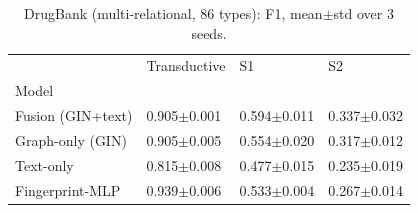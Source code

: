 \begin{table}[t]
\caption{DrugBank (multi-relational, 86 types): F1, mean$\pm$std over 3 seeds.}
\label{tab:drugbank-f1}
\begin{tabular}{llll}
\toprule
 & Transductive & S1 & S2 \\
Model &  &  &  \\
\midrule
Fusion (GIN+text) & 0.905$\pm$0.001 & 0.594$\pm$0.011 & 0.337$\pm$0.032 \\
Graph-only (GIN) & 0.905$\pm$0.005 & 0.554$\pm$0.020 & 0.317$\pm$0.012 \\
Text-only & 0.815$\pm$0.008 & 0.477$\pm$0.015 & 0.235$\pm$0.019 \\
Fingerprint-MLP & 0.939$\pm$0.006 & 0.533$\pm$0.004 & 0.267$\pm$0.014 \\
\bottomrule
\end{tabular}
\end{table}
